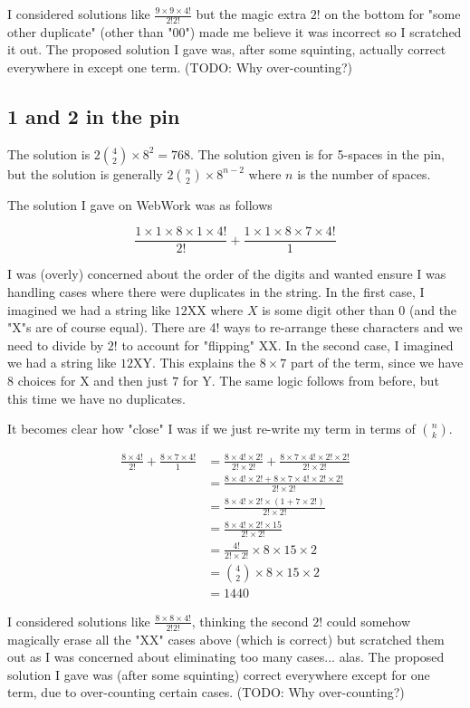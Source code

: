 \documentclass{article}
\begin{document}
I considered solutions like $\frac{9\times9\times4!}{2!2!}$ but the magic extra $2!$ on the bottom for "some other duplicate" (other than "00") made me believe it was incorrect so I scratched it out. The proposed solution I gave was, after some squinting, actually correct everywhere in except one term. (TODO: Why over-counting?)

\subsection{1 and 2 in the pin}

The solution is $2\binom{4}{2} \times 8^2 = 768$. The solution given is for 5-spaces in the pin, but the solution is generally $2\binom{n}{2} \times 8^{n-2}$ where $n$ is the number of spaces.

The solution I gave on WebWork was as follows

$$\frac{1\times1\times8\times1\times4!}{2!} + \frac{1\times1\times8\times7\times4!}{1}$$

I was (overly) concerned about the order of the digits and wanted ensure I was handling cases where there were duplicates in the string. In the first case, I imagined we had a string like $\text{12XX}$ where $X$ is some digit other than 0 (and the "X"s are of course equal). There are 4! ways to re-arrange these characters and we need to divide by $2!$ to account for "flipping" XX. In the second case, I imagined we had a string like $\text{12XY}$. This explains the $8\times7$ part of the term, since we have $8$ choices for X and then just $7$ for Y. The same logic follows from before, but this time we have no duplicates.

It becomes clear how "close" I was if we just re-write my term in terms of $\binom{n}{k}$.

\begin{equation}
	\begin{split}
		\frac{8\times4!}{2!} + \frac{8\times7\times4!}{1} & = \frac{8\times4!\times2!}{2!\times2!} + \frac{8\times7\times4!\times2!\times2!}{2!\times2!} \\
		& = \frac{8\times4!\times2! + 8\times7\times4!\times2!\times2!}{2!\times2!} \\
		& = \frac{8\times4!\times2!\times(1 + 7\times2!)}{2!\times2!} \\
		& = \frac{8\times4!\times2!\times15}{2!\times2!} \\
		& = \frac{4!}{2!\times2!} \times 8\times15\times2 \\
		& = \binom{4}{2} \times 8\times15\times2 \\
		& = 1440
	\end{split}
\end{equation}

I considered solutions like $\frac{8\times8\times4!}{2!2!}$, thinking the second $2!$ could somehow magically erase all the "XX" cases above (which is correct) but scratched them out as I was concerned about eliminating too many cases... alas. The proposed solution I gave was (after some squinting) correct everywhere except for one term, due to over-counting certain cases. (TODO: Why over-counting?)
\end{document}
